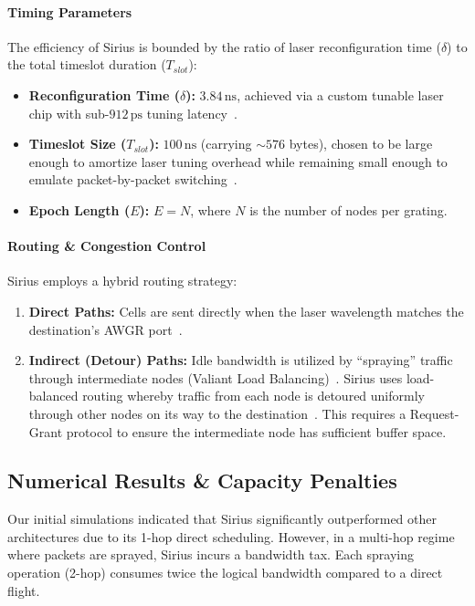 \documentclass{article}
\begin{document}
    \paragraph{Timing Parameters}
    The efficiency of Sirius is bounded by the ratio of laser reconfiguration time ($\delta$) to the total timeslot duration ($T_{slot}$):
    \begin{itemize}
        \item \textbf{Reconfiguration Time ($\delta$):} $3.84\,\text{ns}$, achieved via a custom tunable laser chip with sub-$912\,\text{ps}$ tuning latency~\cite{sirius}.
        \item \textbf{Timeslot Size ($T_{slot}$):} $100\,\text{ns}$ (carrying ${\sim}576$ bytes), chosen to be large enough to amortize laser tuning overhead while remaining small enough to emulate packet-by-packet switching~\cite{sirius}.
        \item \textbf{Epoch Length ($E$):} $E = N$, where $N$ is the number of nodes per grating.
    \end{itemize}

    \paragraph{Routing \& Congestion Control}
    Sirius employs a hybrid routing strategy:
    \begin{enumerate}
        \item \textbf{Direct Paths:} Cells are sent directly when the laser wavelength matches the destination's AWGR port~\cite{sirius}.
        \item \textbf{Indirect (Detour) Paths:} Idle bandwidth is utilized by ``spraying'' traffic through intermediate nodes (Valiant Load Balancing)~\cite{sirius}. Sirius uses load-balanced routing whereby traffic from each node is detoured uniformly through other nodes on its way to the destination~\cite{sirius}. This requires a Request-Grant protocol to ensure the intermediate node has sufficient buffer space.
    \end{enumerate}

    \subsection{Numerical Results \& Capacity Penalties}
    Our initial simulations indicated that Sirius significantly outperformed other architectures due to its 1-hop direct scheduling. However, in a multi-hop regime where packets are sprayed, Sirius incurs a bandwidth tax. Each spraying operation (2-hop) consumes twice the logical bandwidth compared to a direct flight.
\end{document}
